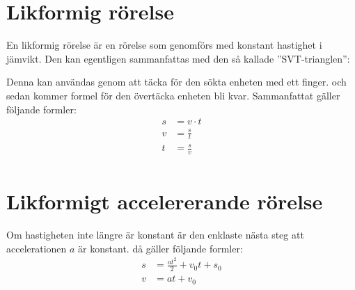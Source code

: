 \section{Likformig rörelse}
En likformig rörelse är en rörelse som genomförs med konstant hastighet i jämvikt. Den kan egentligen sammanfattas med den så kallade ''SVT-trianglen'':
\begin{figure*}[h]
    \centering
\end{figure*}

Denna kan användas genom att täcka för den sökta enheten med ett finger. och sedan kommer formel för den övertäcka enheten bli kvar. Sammanfattat gäller följande formler:
\begin{align*}
    s &= v \cdot t \\
    v &= \frac{s}{t} \\
    t &= \frac{s}{v} \\
\end{align*}

\section{Likformigt accelererande rörelse}
Om hastigheten inte längre är konstant är den enklaste nästa steg att accelerationen $a$ är konstant. då gäller följande formler:
\begin{align*}
    s &= \frac{at^2}{2} + v_0t + s_0 \\
    v &= at + v_0 
\end{align*}

